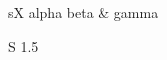 \documentclass{article}
\begin{document}
\begin{tabularx}{\linewidth}{sX}
alpha beta & gamma \\
\end{tabularx}
\begin{tabular}{S}
1.5 \\
\end{tabular}
\end{document}
